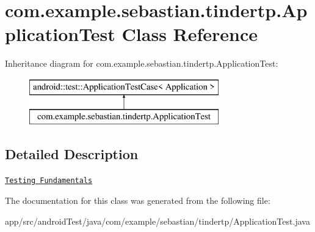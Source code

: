 \hypertarget{classcom_1_1example_1_1sebastian_1_1tindertp_1_1ApplicationTest}{}\section{com.\+example.\+sebastian.\+tindertp.\+Application\+Test Class Reference}
\label{classcom_1_1example_1_1sebastian_1_1tindertp_1_1ApplicationTest}
Inheritance diagram for com.\+example.\+sebastian.\+tindertp.\+Application\+Test\+:\begin{figure}[H]
\begin{center}
\leavevmode
\includegraphics[height=2.000000cm]{classcom_1_1example_1_1sebastian_1_1tindertp_1_1ApplicationTest}
\end{center}
\end{figure}


\subsection{Detailed Description}
\href{http://d.android.com/tools/testing/testing_android.html}{\tt Testing Fundamentals} 

The documentation for this class was generated from the following file\+:\begin{DoxyCompactItemize}
\item 
app/src/android\+Test/java/com/example/sebastian/tindertp/Application\+Test.\+java\end{DoxyCompactItemize}

